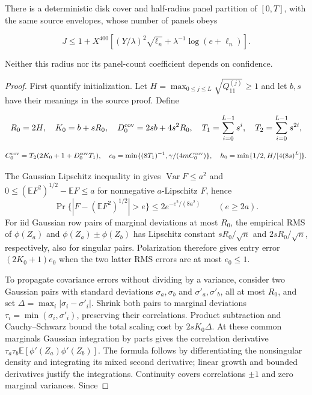 \begin{lemma}
There is a deterministic disk cover and half-radius panel partition of
$[0,T]$, with the same source envelopes, whose number of panels obeys

\begin{equation}
J\le1+X^{400}\left[(Y/\lambda)^2\sqrt{\ell_n}
                      +\lambda^{-1}\log(e+\ell_n)\right].
\label{cp:poly:eq:panel-count}
\end{equation}

Neither this radius nor its panel-count coefficient depends on confidence.

\end{lemma}

\begin{proof}

First quantify initialization. Let
$H=\max_{0\le j\le L}\sqrt{Q^{(j)}_{11}}\ge1$ and let $b,s$
have their meanings in the source proof. Define

\[
R_0=2H,\quad K_0=b+sR_0,\quad D_0^{\rm cov}=2sb+4s^2R_0,
\quad T_1=\sum_{i=0}^{L-1}s^i,\quad T_2=\sum_{i=0}^{L-1}s^{2i},
\]

\[
C_0^{\rm cov}=T_2(2K_0+1+D_0^{\rm cov}T_1),\quad
e_0=\min\{(8T_1)^{-1},\gamma/(4mC_0^{\rm cov})\},\quad
h_0=\min\{1/2,H/[4(8s)^L]\}.
\]

The Gaussian Lipschitz inequality in  gives
$\operatorname{Var}F\le a^2$ and
$0\le(\mathbb EF^2)^{1/2}-\mathbb EF\le a$ for nonnegative
$a$-Lipschitz $F$, hence
\[
\Pr\{|F-(\mathbb EF^2)^{1/2}|>e\}\le2e^{-e^2/(8a^2)}
\qquad(e\ge2a).
\]
For iid Gaussian row pairs of marginal deviations at most $R_0$,
the empirical RMS of $\phi(Z_a)$ and $\phi(Z_a)\pm\phi(Z_b)$
has Lipschitz constant $sR_0/\sqrt n$ and $2sR_0/\sqrt n$,
respectively, also for singular pairs. Polarization therefore gives
entry error $(2K_0+1)e_0$ when the two latter RMS errors are at most
$e_0\le1$.

To propagate covariance errors without dividing by a variance, consider
two Gaussian pairs with standard deviations $\sigma_a,\sigma_b$ and
$\sigma'_a,\sigma'_b$, all at most $R_0$, and set
$\Delta=\max_i|\sigma_i-\sigma'_i|$.
Shrink both pairs to marginal deviations
$\tau_i=\min(\sigma_i,\sigma'_i)$, preserving their correlations.
Product subtraction and Cauchy--Schwarz bound the total scaling cost by
$2sK_0\Delta$. At these common marginals Gaussian integration by parts
gives the correlation derivative
$\tau_a\tau_b\mathbb E[\phi'(Z_a)\phi'(Z_b)]$.
The formula follows by differentiating the nonsingular density and
integrating its mixed second derivative; linear growth and bounded
derivatives justify the integrations. Continuity covers correlations
$\pm1$ and zero marginal variances. Since


\end{proof}
